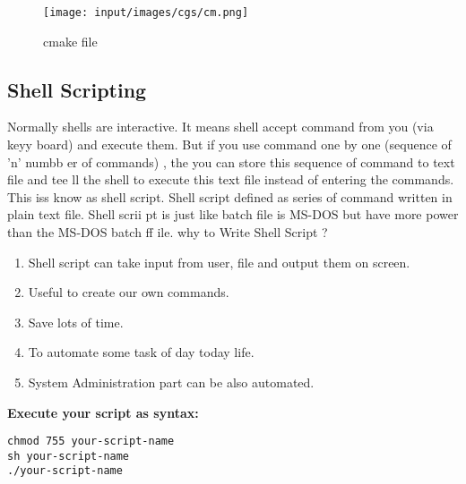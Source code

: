 \begin{figure}[!ht]
\centering
\texttt{[image: input/images/cgs/cm.png]}                   
\caption{cmake file}
\hspace{-1.5em}
\end{figure}

\subsection{Shell Scripting}
Normally shells are interactive. It means shell accept command from you (via keyy
board) and execute them. But if you use command one by one (sequence of 'n' numbb
er of commands) , the you can store this sequence of command to text file and tee
ll the shell to execute this text file instead of entering the commands. This iss
 know as shell script.
Shell script defined as series of command written in plain text file. Shell scrii
pt is just like batch file is MS-DOS but have more power than the MS-DOS batch ff
ile.
why to Write Shell Script ?
\begin{enumerate}
\item Shell script can take input from user, file and output them on screen.
\item Useful to create our own commands.
\item Save lots of time.
\item To automate some task of day today life.
\item System Administration part can be also automated.
\end{enumerate}
{ \bf Execute your script as syntax:}
\begin{verbatim}
chmod 755 your-script-name
sh your-script-name
./your-script-name
\end{verbatim}

